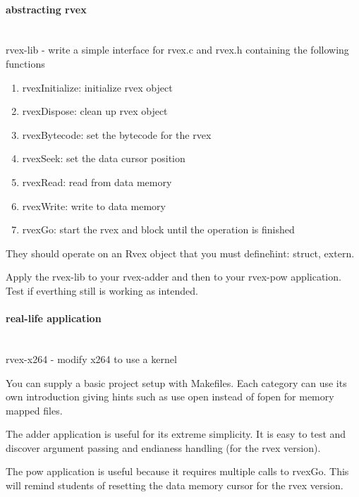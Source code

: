 \paragraph{abstracting rvex} \hfill \\
rvex-lib - write a simple interface for rvex.c and rvex.h containing the following functions
\begin{enumerate}
	\item rvexInitialize: initialize rvex object
	\item rvexDispose: clean up rvex object
	\item rvexBytecode: set the bytecode for the rvex
	\item rvexSeek: set the data cursor position
	\item rvexRead: read from data memory
	\item rvexWrite: write to data memory
	\item rvexGo: start the rvex and block until the operation is finished
\end{enumerate}

They should operate on an Rvex object that you must define\. hint: struct, extern.

Apply the rvex-lib to your rvex-adder and then to your rvex-pow application. Test if everthing still is working as intended.

\paragraph{real-life application} \hfill \\
rvex-x264 - modify x264 to use a kernel

You can supply a basic project setup with Makefiles. Each category can use its own introduction giving hints such as use open instead of fopen for memory mapped files.

The adder application is useful for its extreme simplicity.
It is easy to test and discover argument passing and endianess handling (for the rvex version).

The pow application is useful because it requires multiple calls to rvexGo.
This will remind students of resetting the data memory cursor for the rvex version.

